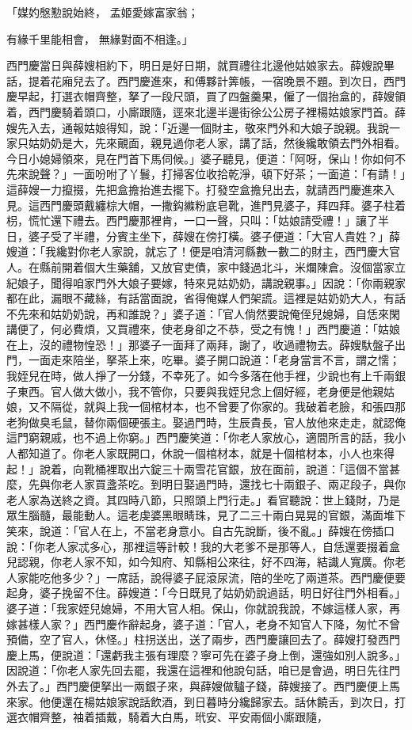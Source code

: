 \begin{showcontents}{}
「媒妁慇懃說始終，  孟姬愛嫁富家翁；

有緣千里能相會，  無緣對面不相逢。」

西門慶當日與薛嫂相約下，明日是好日期，就買禮往北邊他姑娘家去。薛嫂說畢話，提着花廂兒去了。西門慶進來，和傅夥計筭帳，一宿晚景不題。到次日，西門慶早起，打選衣帽齊整，拏了一段尺頭，買了四盤羹果，僱了一個抬盒的，薛嫂領着，西門慶騎着頭口，小廝跟隨，逕來北邊半邊街徐公公房子裡楊姑娘家門首。薛嫂先入去，通報姑娘得知，說：「近邊一個財主，敬來門外和大娘子說親。我說一家只姑奶奶是大，先來覿面，親見過你老人家，講了話，然後纔敢領去門外相看。今日小媳婦領來，見在門首下馬伺候。」婆子聽見，便道：「阿呀，保山！你如何不先來說聲？」一面吩咐了丫鬟，打掃客位收拾乾淨，頓下好茶；一面道：「有請！」這薛嫂一力攛掇，先把盒擔抬進去擺下。打發空盒擔兒出去，就請西門慶進來入見。這西門慶頭戴纏棕大帽，一撒鈎縧粉底皂靴，進門見婆子，拜四拜。婆子柱着枴，慌忙還下禮去。西門慶那裡肯，一口一聲，只叫：「姑娘請受禮！」讓了半日，婆子受了半禮，分賓主坐下，薛嫂在傍打橫。婆子便道：「大官人貴姓？」薛嫂道：「我纔對你老人家說，就忘了！便是咱清河縣數一數二的財主，西門慶大官人。在縣前開着個大生藥舖，又放官吏債，家中錢過北斗，米爛陳倉。沒個當家立紀娘子，聞得咱家門外大娘子要嫁，特來見姑奶奶，講說親事。」因說：「你兩親家都在此，漏眼不藏絲，有話當面說，省得俺媒人們架謊。這裡是姑奶奶大人，有話不先來和姑奶奶說，再和誰說？」婆子道：「官人倘然要說俺侄兒媳婦，自恁來閑講便了，何必費煩，又買禮來，使老身卻之不恭，受之有愧！」西門慶道：「姑娘在上，沒的禮物惶恐！」那婆子一面拜了兩拜，謝了，收過禮物去。薛嫂馱盤子出門，一面走來陪坐，拏茶上來，吃畢。婆子開口說道：「老身當言不言，謂之懦；我姪兒在時，做人掙了一分錢，不幸死了。如今多落在他手裡，少說也有上千兩銀子東西。官人做大做小，我不管你，只要與我姪兒念上個好經，老身便是他親姑娘，又不隔從，就與上我一個棺材本，也不曾要了你家的。我破着老臉，和張四那老狗做臭毛鼠，替你兩個硬張主。娶過門時，生辰貴長，官人放他來走走，就認俺這門窮親戚，也不過上你窮。」西門慶笑道：「你老人家放心，適間所言的話，我小人都知道了。你老人家既開口，休說一個棺材本，就是十個棺材本，小人也來得起！」說着，向靴桶裡取出六錠三十兩雪花官銀，放在面前，說道：「這個不當甚麼，先與你老人家買盞茶吃。到明日娶過門時，還找七十兩銀子、兩疋段子，與你老人家為送終之資。其四時八節，只照頭上門行走。」看官聽說：世上錢財，乃是眾生腦髓，最能動人。這老虔婆黑眼睛珠，見了二三十兩白晃晃的官銀，滿面堆下笑來，說道：「官人在上，不當老身意小。自古先說斷，後不亂。」薛嫂在傍插口說：「你老人家忒多心，那裡這等計較！我的大老爹不是那等人，自恁還要掇着盒兒認親，你老人家不知，如今知府、知縣相公來往，好不四海，結識人寬廣。你老人家能吃他多少？」一席話，說得婆子屁滾尿流，陪的坐吃了兩道茶。西門慶便要起身，婆子挽留不住。薛嫂道：「今日既見了姑奶奶說過話，明日好往門外相看。」婆子道：「我家姪兒媳婦，不用大官人相。保山，你就說我說，不嫁這樣人家，再嫁甚樣人家？」西門慶作辭起身，婆子道：「官人，老身不知官人下降，匆忙不曾預備，空了官人，休怪。」柱拐送出，送了兩步，西門慶讓回去了。薛嫂打發西門慶上馬，便說道：「還虧我主張有理麼？寧可先在婆子身上倒，還強如別人說多。」因說道：「你老人家先回去罷，我還在這裡和他說句話，咱已是會過，明日先往門外去了。」西門慶便拏出一兩銀子來，與薛嫂做驢子錢，薛嫂接了。西門慶便上馬來家。他便還在楊姑娘家說話飲酒，到日暮時分纔歸家去。話休饒舌，到次日，打選衣帽齊整，袖着插戴，騎着大白馬，玳安、平安兩個小廝跟隨，
\end{showcontents}
